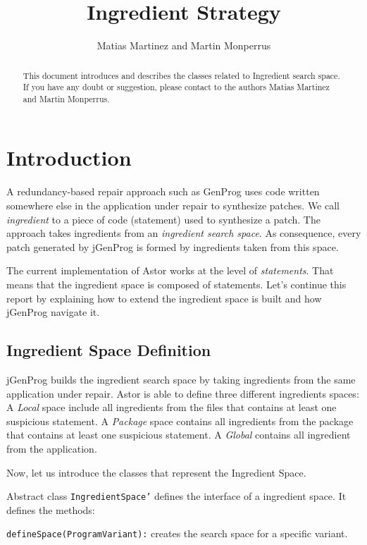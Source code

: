 \documentclass{article}
\title{Ingredient Strategy}
\author{Matias Martinez and Martin Monperrus}
\begin{document}
\date{}

\maketitle

\begin{abstract}
This document introduces and describes the classes related to Ingredient search space.
If you have any doubt or suggestion, please contact to the authors Matias Martinez and Martin Monperrus.

\end{abstract}


\section{Introduction}
A redundancy-based repair approach such as GenProg uses code written somewhere else in the application under repair to synthesize patches. 
We call \emph{ingredient} to a piece of code (statement) used to synthesize a patch.
The approach takes ingredients from an \emph{ingredient search space}.
As consequence, every patch generated by jGenProg is formed by  ingredients taken from this space.

The current implementation of Astor works at the level of \emph{statements}.
That means that the ingredient space is composed of statements.
Let's continue this report by explaining how to extend the ingredient space is built and how jGenProg navigate it.

\subsection{Ingredient Space Definition}
jGenProg builds the ingredient search space by taking ingredients from the same application under repair. 
Astor is able to define three different ingredients spaces: 
A \emph{Local} space include all ingredients from the files that contains at least one suspicious statement. 
A \emph{Package} space contains all ingredients from the package that contains at least one suspicious statement.
A \emph{Global} contains all ingredient from the application.

Now, let us introduce the classes that represent the Ingredient Space.

Abstract class {\tt IngredientSpace'} defines the interface of a ingredient space.
It defines the methods:

{\tt defineSpace(ProgramVariant):} creates the search space for a specific variant.
\end{document}

